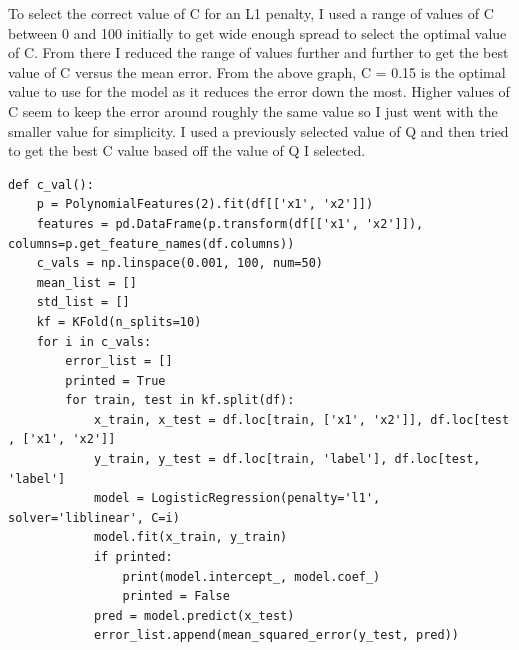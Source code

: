 \documentclass[11pt]{article} %
\begin{document}
To select the correct value of C for an L1 penalty, I used a range of values of C between 0 and 100 initially to get wide enough spread to select the optimal value of C. From there I reduced the range of values further and further to get the best value of C versus the mean error. From the above graph, C = 0.15 is the optimal value to use for the model as it reduces the error down the most. Higher values of C seem to keep the error around roughly the same value so I just went with the smaller value for simplicity. 
I used a previously selected value of Q and then tried to get the best C value based off the value of Q I selected.
\begin{verbatim}
def c_val():
    p = PolynomialFeatures(2).fit(df[['x1', 'x2']])
    features = pd.DataFrame(p.transform(df[['x1', 'x2']]), columns=p.get_feature_names(df.columns))
    c_vals = np.linspace(0.001, 100, num=50)
    mean_list = []
    std_list = []
    kf = KFold(n_splits=10)
    for i in c_vals:
        error_list = []
        printed = True
        for train, test in kf.split(df):
            x_train, x_test = df.loc[train, ['x1', 'x2']], df.loc[test , ['x1', 'x2']]
            y_train, y_test = df.loc[train, 'label'], df.loc[test, 'label']
            model = LogisticRegression(penalty='l1', solver='liblinear', C=i)
            model.fit(x_train, y_train)
            if printed:
                print(model.intercept_, model.coef_)
                printed = False
            pred = model.predict(x_test)
            error_list.append(mean_squared_error(y_test, pred))
\end{verbatim}
\end{document}
